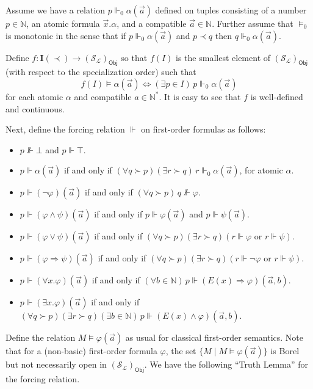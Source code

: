 \documentclass{article}
\theoremstyle{plain}
\def\cal#1{{\mathcal #1}}
\def\IN{{\mathbb N}}
\def\I#1{{{\mathrm{\mathbf I}}(#1)}}
\def\calL{{\cal L}}
\def\calS{{\cal S}}
\newcommand{\Obj}{\mathsf{Obj}}
\begin{document}
Assume we have a relation $p \Vdash_0 \alpha(\vec{a})$ defined on  tuples consisting of a number $p\in\IN$, an atomic formula $\vec{x}.\alpha$, and a compatible $\vec{a}\in\IN$. Further assume that $\vDash_0$ is monotonic in the sense that if $p \Vdash_0 \alpha(\vec{a})$ and $p\prec q$ then $q \Vdash_0 \alpha(\vec{a})$.

Define $f\colon\I{\prec}\to(\calS_\calL)_\Obj$ so that $f(I)$ is the smallest element of  $(\calS_\calL)_\Obj$ (with respect to the specialization order) such that 
\[f(I) \vDash \alpha(\vec{a}) \iff (\exists p\in I)\, p\Vdash_0 \alpha(\vec{a})\]
for each atomic $\alpha$ and compatible $a\in\IN^*$. It is easy to see that $f$ is well-defined and continuous.

Next, define the forcing relation $\Vdash$ on first-order formulas as follows:
\begin{itemize}
\item
$p \not\Vdash\bot$ and $p\Vdash\top$.
\item
$p\Vdash \alpha(\vec{a})$ if and only if $(\forall q \succ p)(\exists r \succ q)\, r \Vdash_0 \alpha(\vec{a})$, for atomic $\alpha$.
\item
$p\Vdash (\neg\varphi)(\vec{a})$ if and only if $(\forall q \succ p)\, q \not\Vdash \varphi$.
\item
$p\Vdash (\varphi \wedge\psi)(\vec{a})$ if and only if $p\Vdash\varphi(\vec{a})$ and $p\Vdash \psi(\vec{a})$.
\item
$p\Vdash (\varphi \vee \psi)(\vec{a})$ if and only if $(\forall q \succ p)(\exists r \succ q)(r\Vdash\varphi \text{ or } r\Vdash\psi)$.
\item
$p\Vdash (\varphi \Rightarrow \psi)(\vec{a})$ if and only if $(\forall q \succ p)(\exists r \succ q)(r\Vdash \neg\varphi \text{ or } r\Vdash\psi)$.
\item
$p\Vdash (\forall x.\varphi)(\vec{a})$ if and only if $(\forall b\in\IN)\, p \Vdash (E(x) \Rightarrow \varphi)(\vec{a},b)$.
\item
$p\Vdash (\exists x.\varphi)(\vec{a})$ if and only if $(\forall q \succ p)(\exists r \succ q)(\exists b\in\IN)\,p\Vdash (E(x)\wedge\varphi)(\vec{a},b)$.
\end{itemize}

Define the relation $M \vDash \varphi(\vec{a})$ as usual for classical first-order semantics. Note that for a (non-basic) first-order formula $\varphi$, the set $\{ M \mid M \vDash \varphi(\vec{a})\}$ is Borel but not necessarily open in $(\calS_\calL)_\Obj$. We have the following ``Truth Lemma'' for the forcing relation. 
\end{document}
